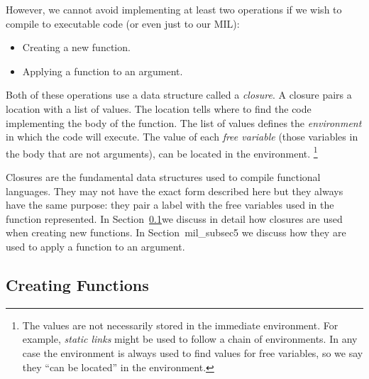 \documentclass[12pt]{report}
\begin{document}
However, we cannot avoid implementing at least two operations if
we wish to compile \lamC to executable code (or even just to our MIL):

\begin{itemize}
\item Creating a new function.
\item Applying a function to an argument.
\end{itemize}

Both of these operations use a data structure called a
\emph{closure}. A closure pairs a location with a list of values. The
location tells where to find the code implementing the body of the
function. The list of values defines the \emph{environment} in which
the code will execute. The value of each \emph{free variable} (those
variables in the body that are not arguments), can be located in the
environment.
\footnote{The values are not necessarily stored in the
  immediate environment. For example, \emph{static links} might be
  used to follow a chain of environments. In any case the environment
  is always used to find values for free variables, so we say they
  ``can be located'' in the environment.}

Closures are the fundamental data structures used to compile
functional languages. They may not have the exact form described here
but they always have the same purpose: they pair a label with the free
variables used in the function represented.  In
Section~\ref{mil_subsec4}we discuss in detail how closures are used
when creating new functions. In Section~{mil_subsec5} we discuss how
they are used to apply a function to an argument.

\subsection{Creating Functions}
\label{mil_subsec4}
\end{document}
